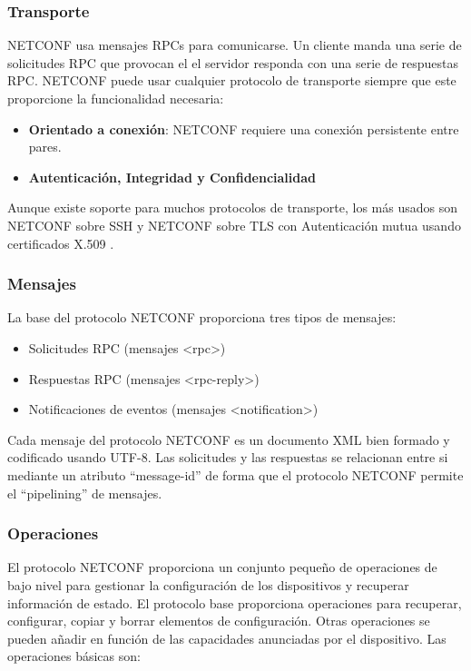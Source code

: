 \subsubsection{Transporte}

\gls{NETCONF} usa mensajes \glspl{RPC} para comunicarse. Un cliente manda una serie de solicitudes \gls{RPC} que provocan el el servidor responda con una serie de respuestas RPC. \gls{NETCONF} puede usar cualquier protocolo de transporte siempre que este proporcione la funcionalidad necesaria:

\begin{itemize}
    \item \textbf{Orientado a conexión}: \gls{NETCONF} requiere una conexión persistente entre pares.
    \item \textbf{Autenticación, Integridad y Confidencialidad}
\end{itemize}

Aunque existe soporte para muchos protocolos de transporte, los más usados son \gls{NETCONF} sobre \gls{SSH} \cite{RFC6242} y \gls{NETCONF} sobre \gls{TLS} con Autenticación mutua usando certificados X.509 \cite{RFC7589}.

\subsubsection{Mensajes}
La base del protocolo \gls{NETCONF} proporciona tres tipos de mensajes:

\begin{itemize}
    \item Solicitudes \gls{RPC} (mensajes <rpc>)
    \item Respuestas \gls{RPC} (mensajes <rpc-reply>)
    \item Notificaciones de eventos (mensajes <notification>)
\end{itemize}

Cada mensaje del protocolo \gls{NETCONF} es un documento \gls{XML} bien formado y codificado usando UTF-8. Las solicitudes y las respuestas se relacionan entre si mediante un atributo \enquote{message-id} de forma que el protocolo \gls{NETCONF} permite el \enquote{pipelining} de mensajes.

\subsubsection{Operaciones}

El protocolo \gls{NETCONF} proporciona un conjunto pequeño de operaciones de bajo nivel para gestionar la configuración de los dispositivos y recuperar información de estado. El protocolo base proporciona operaciones para recuperar, configurar, copiar y borrar elementos de configuración. Otras operaciones se pueden añadir en función de las capacidades anunciadas por el dispositivo. Las operaciones básicas son:

